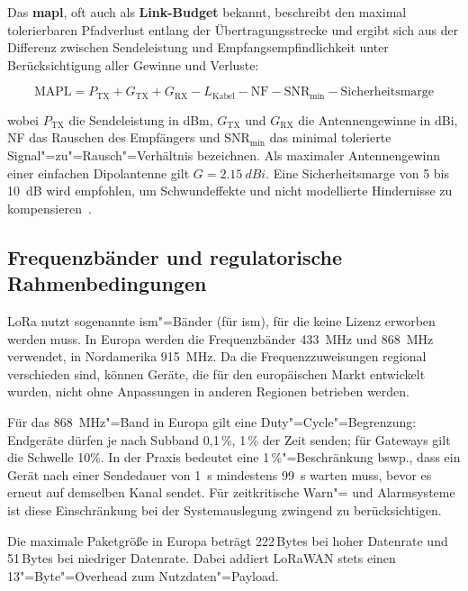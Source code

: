 Das \textbf{\acrfull{mapl}}, oft auch als \textbf{Link-Budget} bekannt, beschreibt den maximal tolerierbaren Pfadverlust
entlang der Übertragungsstrecke und ergibt sich aus der Differenz zwischen
Sendeleistung und Empfangsempfindlichkeit unter Berücksichtigung aller Gewinne und Verluste: 

\begin{equation}
  \text{MAPL} = P_\text{TX} + G_\text{TX} + G_\text{RX}
                - L_\text{Kabel} - \text{NF} - \text{SNR}_\text{min}
                - \text{Sicherheitsmarge}
  \label{eq:mapl}
\end{equation}

wobei $P_\text{TX}$ die Sendeleistung in \si{dBm}, $G_\text{TX}$ und
$G_\text{RX}$ die Antennengewinne in \si{dBi}, NF das Rauschen des Empfängers
und $\text{SNR}_\text{min}$ das minimal tolerierte Signal"=zu"=Rausch"=Verhältnis
bezeichnen. Als maximaler Antennengewinn einer einfachen Dipolantenne gilt
$G = \SI{2.15}{dBi}$. Eine Sicherheitsmarge von 5 bis \SI{10}{dB} wird
empfohlen, um Schwundeffekte und nicht modellierte Hindernisse zu
kompensieren~\cite{LoRaModulationBasics}.

\subsection{Frequenzbänder und regulatorische Rahmenbedingungen}
\label{subsec:frequenzbaender}

LoRa nutzt sogenannte \acrshort{ism}"=Bänder (für \acrlong{ism}), für die keine Lizenz erworben werden muss.
In Europa werden die Frequenzbänder \SI{433}{\MHz} und \SI{868}{\MHz} verwendet,
in Nordamerika \SI{915}{\MHz}. Da die Frequenzzuweisungen regional verschieden sind,
können Geräte, die für den europäischen Markt entwickelt wurden, nicht ohne Anpassungen in anderen Regionen betrieben werden.

Für das \SI{868}{\MHz}"=Band in Europa gilt eine Duty"=Cycle"=Begrenzung: Endgeräte dürfen je nach Subband 0{,}1\,\%, 1\,\% der 
Zeit senden; für Gateways gilt die Schwelle 10\%. In der Praxis
bedeutet eine 1\,\%"=Beschränkung bswp., dass ein Gerät nach einer
Sendedauer von \SI{1}{\s} mindestens \SI{99}{\s} warten muss, bevor es erneut auf
demselben Kanal sendet. Für zeitkritische Warn"= und Alarmsysteme ist diese
Einschränkung bei der Systemauslegung zwingend zu berücksichtigen.

Die maximale Paketgröße in Europa beträgt 222\,Bytes bei hoher Datenrate und
51\,Bytes bei niedriger Datenrate. Dabei addiert LoRaWAN stets einen
13"=Byte"=Overhead zum Nutzdaten"=Payload. %

